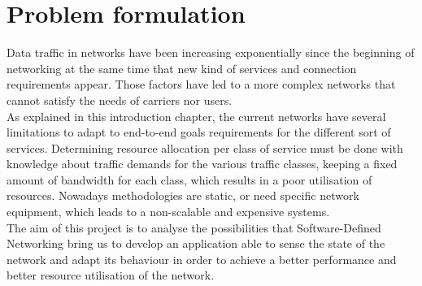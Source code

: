 \section{Problem formulation}
\label{sec:problemformulation}

Data traffic in networks have been increasing exponentially since the beginning of networking at the same time that new kind of services and connection requirements appear. Those factors have led to a more complex networks that cannot satisfy the needs of carriers nor users.\\  

As explained in this introduction chapter, the current networks have several limitations to adapt to end-to-end goals requirements for the different sort of services. Determining resource allocation per class of service must be done with knowledge about traffic demands for the various traffic classes, keeping a fixed amount of bandwidth for each class, which results in a poor utilisation of resources. Nowadays methodologies are static, or need specific network equipment, which leads to a non-scalable and expensive systems.\\

The aim of this project is to analyse the possibilities that Software-Defined Networking bring us to develop an application able to sense the state of the network and adapt its behaviour in order to achieve a better performance and better resource utilisation of the network.